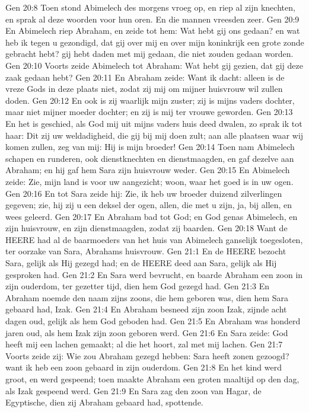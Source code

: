 Gen 20:8  Toen stond Abimelech des morgens vroeg op, en riep al zijn knechten, en sprak al deze woorden voor hun oren. En die mannen vreesden zeer.
Gen 20:9  En Abimelech riep Abraham, en zeide tot hem: Wat hebt gij ons gedaan? en wat heb ik tegen u gezondigd, dat gij over mij en over mijn koninkrijk een grote zonde gebracht hebt? gij hebt daden met mij gedaan, die niet zouden gedaan worden.
Gen 20:10  Voorts zeide Abimelech tot Abraham: Wat hebt gij gezien, dat gij deze zaak gedaan hebt?
Gen 20:11  En Abraham zeide: Want ik dacht: alleen is de vreze Gods in deze plaats niet, zodat zij mij om mijner huisvrouw wil zullen doden.
Gen 20:12  En ook is zij waarlijk mijn zuster; zij is mijns vaders dochter, maar niet mijner moeder dochter; en zij is mij ter vrouwe geworden.
Gen 20:13  En het is geschied, als God mij uit mijns vaders huis deed dwalen, zo sprak ik tot haar: Dit zij uw weldadigheid, die gij bij mij doen zult; aan alle plaatsen waar wij komen zullen, zeg van mij: Hij is mijn broeder!
Gen 20:14  Toen nam Abimelech schapen en runderen, ook dienstknechten en dienstmaagden, en gaf dezelve aan Abraham; en hij gaf hem Sara zijn huisvrouw weder.
Gen 20:15  En Abimelech zeide: Zie, mijn land is voor uw aangezicht; woon, waar het goed is in uw ogen.
Gen 20:16  En tot Sara zeide hij: Zie, ik heb uw broeder duizend zilverlingen gegeven; zie, hij zij u een deksel der ogen, allen, die met u zijn, ja, bij allen, en wees geleerd.
Gen 20:17  En Abraham bad tot God; en God genas Abimelech, en zijn huisvrouw, en zijn dienstmaagden, zodat zij baarden.
Gen 20:18  Want de HEERE had al de baarmoeders van het huis van Abimelech ganselijk toegesloten, ter oorzake van Sara, Abrahams huisvrouw.
Gen 21:1  En de HEERE bezocht Sara, gelijk als Hij gezegd had; en de HEERE deed aan Sara, gelijk als Hij gesproken had.
Gen 21:2  En Sara werd bevrucht, en baarde Abraham een zoon in zijn ouderdom, ter gezetter tijd, dien hem God gezegd had.
Gen 21:3  En Abraham noemde den naam zijns zoons, die hem geboren was, dien hem Sara gebaard had, Izak.
Gen 21:4  En Abraham besneed zijn zoon Izak, zijnde acht dagen oud, gelijk als hem God geboden had.
Gen 21:5  En Abraham was honderd jaren oud, als hem Izak zijn zoon geboren werd.
Gen 21:6  En Sara zeide: God heeft mij een lachen gemaakt; al die het hoort, zal met mij lachen.
Gen 21:7  Voorts zeide zij: Wie zou Abraham gezegd hebben: Sara heeft zonen gezoogd? want ik heb een zoon gebaard in zijn ouderdom.
Gen 21:8  En het kind werd groot, en werd gespeend; toen maakte Abraham een groten maaltijd op den dag, als Izak gespeend werd.
Gen 21:9  En Sara zag den zoon van Hagar, de Egyptische, dien zij Abraham gebaard had, spottende.
